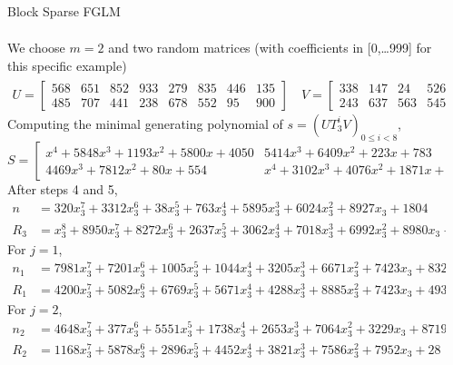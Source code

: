 \documentclass[final]{beamer}
\newlength{\sepwid}
\newlength{\twocolwid}
\begin{document}
\begin{frame}[t]
\begin{columns}[t]
\begin{column}{\twocolwid}
\begin{block}{Block Sparse FGLM}
\begin{example}
\begin{align*}
		\end{align*}
		We choose $m = 2$ and two random matrices (with coefficients in [0,\dots 999]
		for this specific example)
		\begin{align*}
		U = 
		\begin{bmatrix}
		568 &651 &852 &933 &279 &835 &446 &135\\
		485 &707 &441 &238 &678 &552  &95 &900
		\end{bmatrix} \quad
		V =
		\begin{bmatrix}
		338 &147 & 24 &526 &549 &806 &741 &966\\
		243 &637 &563 &545 &580 &432 &544 &165
		\end{bmatrix}^t
		\end{align*}
		Computing the minimal generating polynomial of $s = (UT_3^iV)_{0 \le i < 8}$,
		$$S = \begin{bmatrix}
        x^4 + 5848x^3 + 1193x^2 + 5800x + 4050 &5414x^3 + 6409x^2 + 223x + 783\\
        4469x^3 + 7812x^2 + 80x + 554 &x^4 + 3102x^3 + 4076x^2 + 1871x + 3985
		\end{bmatrix}
		$$
		After steps 4 and 5,
		\begin{align*}
		n &= 320x_3^7 + 3312x_3^6 + 38x_3^5 + 763x_3^4 + 5895x_3^3 + 6024x_3^2 + 8927x_3 + 1804
		\\
		R_3 &= x_3^8 + 8950x_3^7 + 8272x_3^6 + 2637x_3^5 + 3062x_3^4 + 7018x_3^3 + 6992x_3^2 + 8980x_3 + 7724
		\end{align*}
		For $j = 1$,
		\begin{align*}
		n_1 &= 7981x_3^7 + 7201x_3^6 + 1005x_3^5 + 1044x_3^4 + 3205x_3^3 + 6671x_3^2 + 7423x_3 + 832\\
		R_1 &= 4200x_3^7 + 5082x_3^6 + 6769x_3^5 + 5671x_3^4 + 4288x_3^3 + 8885x_3^2 + 7423x_3 + 4930
		\end{align*}
		For $j = 2$,
		\begin{align*}
		n_2 &= 4648x_3^7 + 377x_3^6 + 5551x_3^5 + 1738x_3^4 + 2653x_3^3 + 7064x_3^2 + 3229x_3 + 8719\\
		R_2 &= 1168x_3^7 + 5878x_3^6 + 2896x_3^5 + 4452x_3^4 + 3821x_3^3 + 7586x_3^2 + 7952x_3 + 28
		\end{align*}
	\end{example}
\end{block}

\end{column} %

\begin{column}{\sepwid}\end{column} %


\end{columns}
\end{frame}
\end{document}
